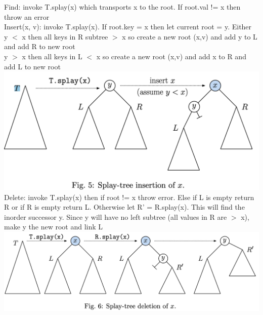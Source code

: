 \documentclass{article}
\begin{document}
  Find: invoke T.splay(x) which transports x to the root. If root.val != x then throw an error\\
  Insert(x, v): invoke T.splay(x). If root.key = x then let current root = y. Either \\
  \indent y $<$ x then all keys in R subtree $>$ x so create a new root (x,v) and add y to L and add R to new root \\
  \indent y $>$ x then all keys in L $<$ x so create a new root (x,v) and add x to R and add L to new root\\
  \includegraphics[width=\textwidth]{SplayInsert}
  Delete: invoke T.splay(x) then if root != x throw error. Else if L is empty return R or if R is empty return L. Otherwise let R' = R.splay(x). This will find the inorder successor y. Since y will have no left subtree (all values in R are $>$ x), make y the new root and link L\\
  \includegraphics[width=\textwidth]{SplayDelete}
  \newpage
\end{document}

